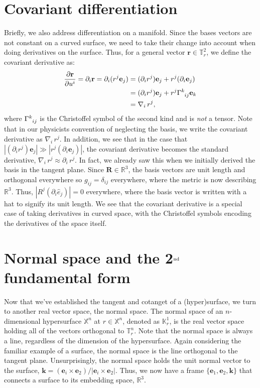 \begin{appendices}
\section{Covariant differentiation}
Briefly, we also address differentiation on a manifold.
Since the bases vectors are not constant on a curved surface, we need to take their change into account when doing derivatives on the surface.
Thus, for a general vector $\mathbf{r} \in \mathbb{T}^2_r$, we define the covariant derivative as:
\begin{align}
  \frac{\partial \mathbf{r}}{\partial u^i} = \partial_i \mathbf{r} = \partial_i (r^j \mathbf{e}_j) &= (\partial_i r^j)\mathbf{e}_j + r^j(\partial_i \mathbf{e}_j) \nonumber \\
  &= (\partial_i r^j)\mathbf{e}_j + r^j \tensor{\Gamma}{^k_{ij}} \mathbf{e}_k \nonumber \\
  &= \nabla_i\,r^j,
\end{align}
where $\tensor{\Gamma}{^k_{ij}}$ is the Christoffel symbol of the second kind and is \emph{not} a tensor.
Note that in our physicists convention of neglecting the basis, we write the covariant derivative as $\nabla_i\,r^j$.
In addition, we see that in the case that $|(\partial_i r^j)\mathbf{e}_j| \gg |r^j(\partial_i \mathbf{e}_j)|$, the covariant derivative becomes the standard derivative, $\nabla_i\,r^j \approx \partial_i \, r^j$.
In fact, we already saw this when we initially derived the basis in the tangent plane.
Since $\mathbf{R} \in \mathbb{R}^3$, the basis vectors are unit length and orthogonal everywhere so  $g_{ij} = \delta_{ij}$ everywhere, where the metric is now describing $\mathbb{R}^3$.
Thus, $|R^j(\partial_i \hat{e}_j)| = 0$ everywhere, where the basis vector is written with a hat to signify its unit length.
We see that the covariant derivative is a special case of taking derivatives in curved space, with the Christoffel symbols encoding the derivatives of the space itself.




\section{Normal space and the 2$^{\rm nd}$ fundamental form}
Now that we've established the tangent and cotanget of a (hyper)surface, we turn to another real vector space, the normal space.
The normal space of an $n$-dimensional hypersurface $\mathbb{X}^n$ at $r\in \mathbb{X}^n$, denoted as $\mathbb{K}^1_r$, is the real vector space holding all of the vectors orthogonal to $\mathbb{T}^n_r$.
Note that the normal space is always a line, regardless of the dimension of the hypersurface.
Again considering the familiar example of a surface, the normal space is the line orthogonal to the tangent plane.
Unsurprisingly, the normal space holds the unit normal vector to the surface, $\mathbf{k} = (\mathbf{e}_i \times \mathbf{e}_2)/|\mathbf{e}_i \times \mathbf{e}_2|$.
Thus, we now have a frame $\{\mathbf{e}_1, \mathbf{e}_2, \mathbf{k}\}$ that connects a surface to its embedding space, $\mathbb{R}^3$. \\


\end{appendices}
